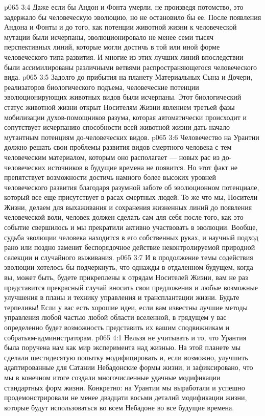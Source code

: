 \vs p065 3:4 \pc Даже если бы Андон и Фонта умерли, не произведя потомство, это задержало бы человеческую эволюцию, но не остановило бы ее. После появления Андона и Фонты и до того, как потенции животной жизни к человеческой мутации были исчерпаны, эволюционировало не менее семи тысяч перспективных линий, которые могли достичь в той или иной форме человеческого типа развития. И многие из этих лучших линий впоследствии были ассимилированы различными ветвями распространяющегося человеческого вида.
\vs p065 3:5 Задолго до прибытия на планету Материальных Сына и Дочери, реализаторов биологического подъема, человеческие потенции эволюционирующих животных видов были исчерпаны. Этот биологический статус животной жизни открыт Носителям Жизни явлением третьей фазы мобилизации духов\hyp{}помощников разума, которая автоматически происходит и сопутствует исчерпанию способности всей животной жизни дать начало мутантным потенциям до\hyp{}человеческих видов.
\vs p065 3:6 \pc Человечество на Урантии должно решать свои проблемы развития видов смертного человека с тем человеческим материалом, которым оно располагает --- новых рас из до\hyp{}человеческих источников в будущие времена не появится. Но этот факт не препятствует возможности достичь намного более высоких уровней человеческого развития благодаря разумной заботе об эволюционном потенциале, который все еще присутствует в расах смертных людей. То же что мы, Носители Жизни, делаем для выхаживания и сохранения жизненных линий до появления человеческой воли, человек должен сделать сам для себя после того, как это событие свершилось и мы прекратили активно участвовать в эволюции. Вообще, судьба эволюции человека находится в его собственных руках, и научный подход рано или поздно заменит беспорядочное действие неконтролируемой природной селекции и случайного выживания.
\vs p065 3:7 И в продолжение темы содействия эволюции хотелось бы подчеркнуть, что однажды в отдаленном будущем, когда вы, может быть, будете прикреплены к отрядам Носителей Жизни, вам не раз представится прекрасный случай вносить свои предложения и любые возможные улучшения в планы и технику управления и трансплантации жизни. Будьте терпеливы! Если у вас есть хорошие идеи, если вам известны лучшие методы управления любой частью любой области вселенной, в грядущем у вас определенно будет возможность представить их вашим сподвижникам и собратьям\hyp{}администраторам.
\vs p065 4:1 Нельзя не учитывать и то, что Урантия была поручена нам как мир эксперимента над жизнью. На этой планете мы сделали шестидесятую попытку модифицировать и, если возможно, улучшить адаптированные для Сатании Небадонские формы жизни, и зафиксировано, что мы в конечном итоге создали многочисленные удачные модификации стандартных форм жизни. Конкретно: на Урантии мы выработали и успешно продемонстрировали не менее двадцати восьми деталий модификации жизни, которые будут использоваться во всем Небадоне во все будущие времена.
